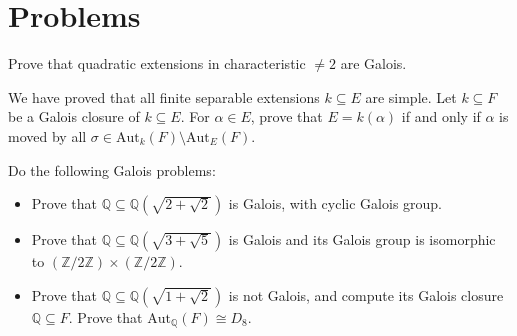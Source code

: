 \documentclass[openany]{book}
\begin{document}
\section*{Problems}

\begin{prob}
Prove that quadratic extensions in characteristic $\neq 2$ are Galois.
\end{prob}




\begin{prob}
We have proved that all finite separable extensions $k \subseteq E$ are simple. Let $k \subseteq F$ be a Galois closure of $k \subseteq E$. For $\alpha \in E$, prove that $E = k(\alpha)$ if and only if $\alpha$ is moved by all $\sigma \in \text{Aut}_k(F) \setminus \text{Aut}_E(F)$.
\end{prob}

\begin{prob}
    Do the following Galois problems:
\begin{itemize}
    \item Prove that $\mathbb{Q} \subseteq \mathbb{Q}(\sqrt{2 + \sqrt{2}})$ is Galois, with cyclic Galois group.
    \item Prove that $\mathbb{Q} \subseteq \mathbb{Q}(\sqrt{3 + \sqrt{5}})$ is Galois and its Galois group is isomorphic to $(\mathbb{Z}/2\mathbb{Z}) \times (\mathbb{Z}/2\mathbb{Z})$.
    \item Prove that $\mathbb{Q} \subseteq \mathbb{Q}(\sqrt{1 + \sqrt{2}})$ is not Galois, and compute its Galois closure $\mathbb{Q} \subseteq F$. Prove that $\text{Aut}_{\mathbb{Q}}(F) \cong D_8$.
\end{itemize}
\end{prob}
\end{document}
